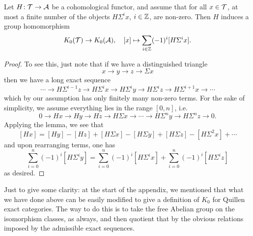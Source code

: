 \begin{proposition}
	Let \(H\!:\mathcal{T}\to\mathcal{A}\) be a cohomological functor, and assume that for all \(x\in\mathcal{T}\), at most a finite number of the objects \(H\Sigma^ix\), \(i\in\mathbb{Z}\), are non-zero.
	Then \(H\) induces a group homomorphism
	\[ K_0(\mathcal{T}) \to K_0(\mathcal{A}),\quad [x]\mapsto \sum_{i\in\mathbb{Z}} (-1)^i[H\Sigma^ix]. \]
\end{proposition}
\begin{proof}
To see this, just note that if we have a distinguished triangle
\[ x \to y \to z \to \Sigma x \]
then we have a long exact sequence
\[ \cdots \to H\Sigma^{i-1}z \to H\Sigma^ix\to H\Sigma^iy\to H\Sigma^iz \to H\Sigma^{i+1} x \to \cdots \]
which by our assumption has only finitely many non-zero terms. For the sake of simplicity, we assume everything lies in the range \([0,n]\), i.e.
\[ 0 \to Hx\to Hy\to Hz \to H\Sigma x \to \cdots \to H\Sigma^ny \to H\Sigma^n z \to 0. \]
Applying the lemma, we see that
\[ [Hx] = [Hy] - [Hz] + [H\Sigma x] - [H\Sigma y] + [H\Sigma z] - [H\Sigma^2x] + \cdots \]
and upon rearranging terms, one has
\[ \sum_{i=0}^n (-1)^i[H\Sigma^iy] = \sum_{i=0}^n (-1)^i[H\Sigma^ix] + \sum_{i=0}^n (-1)^i[H\Sigma^iz] \]
as desired.
\end{proof}

\begin{remark}
	Just to give some clarity: at the start of the appendix, we mentioned that what we have done above can be easily modified to give a definition of \(K_0\) for Quillen exact categories.
	The way to do this is to take the free Abelian group on the isomorphism classes, as always, and then quotient that by the obvious relations imposed by the admissible
	exact sequences.
\end{remark}
